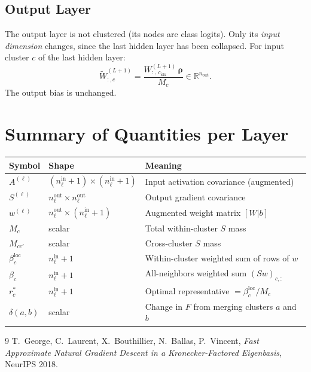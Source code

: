 \documentclass[11pt]{article}
\begin{document}
\subsection{Output Layer}

The output layer is not clustered (its nodes are class logits). Only its
\emph{input dimension} changes, since the last hidden layer has been collapsed.
For input cluster $c$ of the last hidden layer:
\[
  \widetilde{W}^{(L+1)}_{:, c} = \frac{W^{(L+1)}_{:,\,c_{\mathrm{idx}}}\,\bm{\rho}}{M_c}
  \in \mathbb{R}^{n_{\mathrm{out}}}.
  \label{eq:Wout}
\]
The output bias is unchanged.

\section{Summary of Quantities per Layer}

\begin{center}
\renewcommand{\arraystretch}{1.4}
\begin{tabular}{lll}
\hline
\textbf{Symbol} & \textbf{Shape} & \textbf{Meaning} \\
\hline
$A^{(\ell)}$ & $(n_\ell^{\mathrm{in}}+1)\times(n_\ell^{\mathrm{in}}+1)$ & Input activation covariance (augmented) \\
$S^{(\ell)}$ & $n_\ell^{\mathrm{out}}\times n_\ell^{\mathrm{out}}$ & Output gradient covariance \\
$w^{(\ell)}$ & $n_\ell^{\mathrm{out}}\times(n_\ell^{\mathrm{in}}+1)$ & Augmented weight matrix $[W|b]$ \\
$M_c$ & scalar & Total within-cluster $S$ mass \\
$M_{cc'}$ & scalar & Cross-cluster $S$ mass \\
$\beta_c^{\mathrm{loc}}$ & $n_\ell^{\mathrm{in}}+1$ & Within-cluster weighted sum of rows of $w$ \\
$\beta_c$ & $n_\ell^{\mathrm{in}}+1$ & All-neighbors weighted sum $(Sw)_{c,:}$ \\
$r_c^*$ & $n_\ell^{\mathrm{in}}+1$ & Optimal representative $= \beta_c^{\mathrm{loc}}/M_c$ \\
$\delta(a,b)$ & scalar & Change in $F$ from merging clusters $a$ and $b$ \\
\hline
\end{tabular}
\end{center}

\begin{thebibliography}{9}
  T.~George, C.~Laurent, X.~Bouthillier, N.~Ballas, P.~Vincent,
  \textit{Fast Approximate Natural Gradient Descent in a Kronecker-Factored
  Eigenbasis},
  NeurIPS 2018.
\end{thebibliography}
\end{document}
